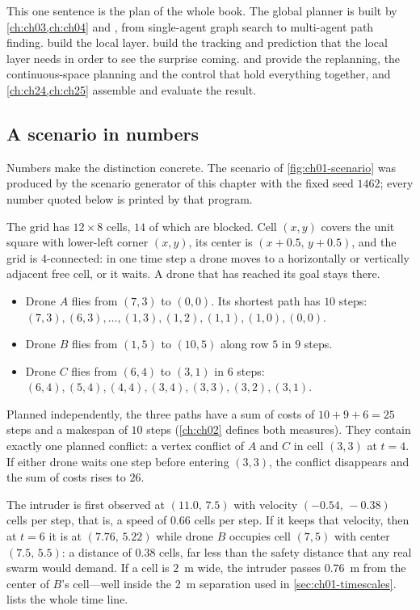 This one sentence is the plan of the whole book. The global planner is built by
\cref{ch:ch03,ch:ch04} and , from single-agent graph
search to multi-agent path finding.  build the local
layer.  build the tracking and prediction that the local
layer needs in order to see the surprise coming.  and
 provide the replanning, the continuous-space planning
and the control that hold everything together, and \cref{ch:ch24,ch:ch25} assemble
and evaluate the result.

\subsection{A scenario in numbers}
\label{sec:ch01-example}

Numbers make the distinction concrete. The scenario of \cref{fig:ch01-scenario} was
produced by the scenario generator  of this chapter with
the fixed seed $1462$; every number quoted below is printed by that program.

\begin{example}
\label{ex:ch01-scenario}
The grid has $12\times 8$ cells, $14$ of which are blocked. Cell $(x,y)$ covers the unit
square with lower-left corner $(x,y)$, its center is $(x+0.5,\,y+0.5)$, and the grid is
4-connected: in one time step a drone moves to a horizontally or vertically adjacent
free cell, or it waits. A drone that has reached its goal stays there.
\begin{itemize}
  \item Drone $A$ flies from $(7,3)$ to $(0,0)$. Its shortest path has $10$ steps:
        $(7,3),(6,3),\dots,(1,3),(1,2),(1,1),(1,0),(0,0)$.
  \item Drone $B$ flies from $(1,5)$ to $(10,5)$ along row $5$ in $9$ steps.
  \item Drone $C$ flies from $(6,4)$ to $(3,1)$ in $6$ steps:
        $(6,4),(5,4),(4,4),(3,4),(3,3),(3,2),(3,1)$.
\end{itemize}
Planned independently, the three paths have a sum of costs of $10+9+6=25$ steps and a
makespan of $10$ steps (\cref{ch:ch02} defines both measures). They contain exactly one
planned conflict: a vertex conflict of $A$ and $C$ in cell $(3,3)$ at $t=4$. If either
drone waits one step before entering $(3,3)$, the conflict disappears and the sum of
costs rises to $26$.

The intruder is first observed at $(11.0,\,7.5)$ with velocity $(-0.54,\,-0.38)$ cells
per step, that is, a speed of $0.66$ cells per step. If it keeps that velocity, then
at $t=6$ it is at $(7.76,\,5.22)$ while drone $B$ occupies cell $(7,5)$ with center
$(7.5,\,5.5)$: a distance of $0.38$ cells, far less than the safety distance that any
real swarm would demand. If a cell is $2$~m wide, the intruder passes $0.76$~m from
the center of $B$'s cell---well inside the $2$~m separation used in
\cref{sec:ch01-timescales}.  lists the whole time line.
\end{example}

